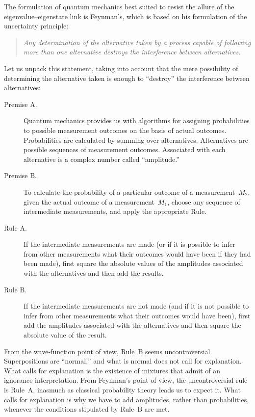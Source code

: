 \documentclass[smallextended]{svjour3}
\newcommand{\bq}{\begin{quote}}
\newcommand{\eq}{\end{quote}}
\begin{document}
The formulation of quantum mechanics best suited to resist the allure of the eigenvalue--eigenstate link is Feynman's, which is based on his formulation of the uncertainty principle\cite{Feynman1948,FHS}:
\bq
\emph{Any determination of the alternative taken by a process capable of following more than one alternative destroys the interference between alternatives.}
\eq
Let us unpack this statement, taking into account that the mere possibility of determining the alternative taken is enough to ``destroy'' the interference between alternatives:
\begin{description}
\item[{Premise A}.]Quantum mechanics provides us with algorithms for assigning probabilities to possible measurement outcomes on the basis of actual outcomes. Probabilities are calculated by summing over alternatives. Alternatives are possible sequences of measurement outcomes. Associated with each alternative is a complex number called ``amplitude.''
\item[{Premise B}.]To calculate the probability of a particular outcome of a measurement~$M_2$, given the actual outcome of a  measurement~$M_1$, choose any sequence of intermediate measurements, and apply the appropriate Rule.
\item[{Rule A}.]If the intermediate measurements are made (or if it is possible to infer from other measurements what their outcomes would have been if they had been made), first square the absolute values of the amplitudes associated with the alternatives and then add the results.
\item[{Rule B}.]If the intermediate measurements are not made (and if it is not possible to infer from other measurements what their outcomes would have been), first add the amplitudes associated with the alternatives and then square the absolute value of the result.
\end{description}
From the wave-function point of view, Rule~B seems uncontroversial. Superpositions are ``normal,'' and what is normal does not call for explanation. What calls for explanation is the existence of mixtures that admit of an ignorance interpretation. From Feynman's point of view, the uncontroversial rule is Rule~A, inasmuch as classical probability theory leads us to expect it. What calls for explanation is why we have to add amplitudes, rather than probabilities, whenever the conditions stipulated by Rule~B are met. 
\end{document}
